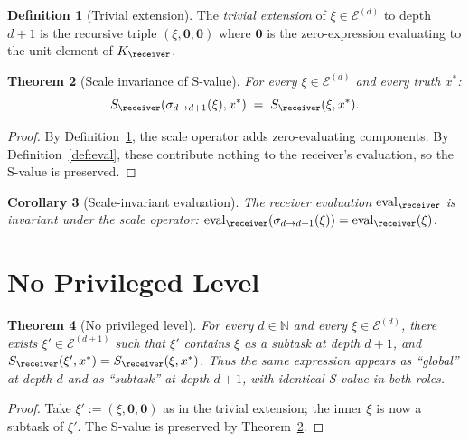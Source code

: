 \documentclass[11pt,a4paper]{article}
\theoremstyle{thmstyle}
\newtheorem{theorem}{Theorem}[section]
\newtheorem{corollary}[theorem]{Corollary}
\theoremstyle{thmstyle}
\theoremstyle{definition}
\newtheorem{definition}[theorem]{Definition}
\theoremstyle{remark}
\DeclareMathOperator{\eval}{eval}
\newcommand{\Natural}{\mathbb{N}}
\newcommand{\Expr}{\mathcal{E}}
\newcommand{\Sscalar}{S}
\begin{document}
\begin{definition}[Trivial extension]\label{def:trivial-ext}
The \emph{trivial extension} of $\xi \in \Expr^{(d)}$
to depth $d+1$ is the recursive triple
$(\xi, \mathbf{0}, \mathbf{0})$ where $\mathbf{0}$ is
the zero-expression evaluating to the unit element of
$K_{\receiver}$.
\end{definition}

\begin{theorem}[Scale invariance of S-value]
\label{thm:scale-inv}
For every $\xi \in \Expr^{(d)}$ and every
truth $x^{*}$:
\[
\Sscalar_{\receiver}(\sigma_{d \to d+1}(\xi), x^{*})
\;=\; \Sscalar_{\receiver}(\xi, x^{*}).
\]
\end{theorem}

\begin{proof}
By Definition~\ref{def:trivial-ext}, the scale operator
adds zero-evaluating components.  By
Definition~\ref{def:eval}, these contribute nothing to
the receiver's evaluation, so the S-value is preserved.
\end{proof}

\begin{corollary}[Scale-invariant evaluation]
\label{cor:scale-inv-eval}
The receiver evaluation $\eval_{\receiver}$ is
invariant under the scale operator:
$\eval_{\receiver}(\sigma_{d \to d+1}(\xi)) =
\eval_{\receiver}(\xi)$.
\end{corollary}

\section{No Privileged Level}
\label{sec:no-privileged-level}

\begin{theorem}[No privileged level]\label{thm:no-priv-level}
For every $d \in \Natural$ and every $\xi \in
\Expr^{(d)}$, there exists $\xi' \in \Expr^{(d+1)}$
such that $\xi'$ contains $\xi$ as a subtask at depth
$d+1$, and $\Sscalar_{\receiver}(\xi', x^{*}) =
\Sscalar_{\receiver}(\xi, x^{*})$.  Thus the same
expression appears as ``global'' at depth $d$ and as
``subtask'' at depth $d+1$, with identical S-value
in both roles.
\end{theorem}

\begin{proof}
Take $\xi' := (\xi, \mathbf{0}, \mathbf{0})$ as in the
trivial extension; the inner $\xi$ is now a
subtask of $\xi'$.  The S-value is preserved by
Theorem~\ref{thm:scale-inv}.
\end{proof}
\end{document}
